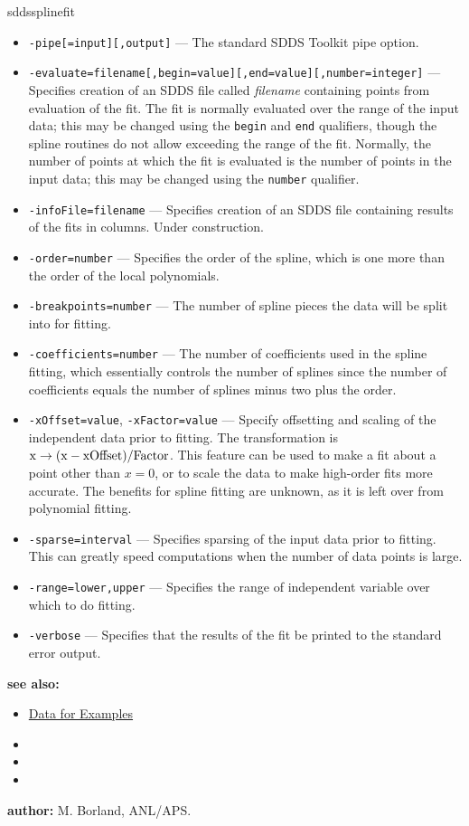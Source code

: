 \begin{sddsprog}{sddssplinefit}
    \begin{itemize}
      \item \verb|-pipe[=input][,output]| --- The standard SDDS Toolkit pipe option.
      \item \verb|-evaluate=filename[,begin=value][,end=value][,number=integer]| --- Specifies creation of an SDDS file called \emph{filename} containing points from evaluation of the fit. The fit is normally evaluated over the range of the input data; this may be changed using the \verb|begin| and \verb|end| qualifiers, though the spline routines do not allow exceeding the range of the fit. Normally, the number of points at which the fit is evaluated is the number of points in the input data; this may be changed using the \verb|number| qualifier.
      \item \verb|-infoFile=filename| --- Specifies creation of an SDDS file containing results of the fits in columns. Under construction.
      \item \verb|-order=number| --- Specifies the order of the spline, which is one more than the order of the local polynomials.
      \item \verb|-breakpoints=number| --- The number of spline pieces the data will be split into for fitting.
      \item \verb|-coefficients=number| --- The number of coefficients used in the spline fitting, which essentially controls the number of splines since the number of coefficients equals the number of splines minus two plus the order.
      \item \verb|-xOffset=value|, \verb|-xFactor=value| --- Specify offsetting and scaling of the independent data prior to fitting. The transformation is ${\rm x \rightarrow (x - xOffset)/Factor}$. This feature can be used to make a fit about a point other than $x=0$, or to scale the data to make high-order fits more accurate. The benefits for spline fitting are unknown, as it is left over from polynomial fitting.
      \item \verb|-sparse=interval| --- Specifies sparsing of the input data prior to fitting. This can greatly speed computations when the number of data points is large.
      \item \verb|-range=lower,upper| --- Specifies the range of independent variable over which to do fitting.
      \item \verb|-verbose| --- Specifies that the results of the fit be printed to the standard error output.
    \end{itemize}
  \item \textbf{see also:}
    \begin{itemize}
      \item \hyperref[exampleData]{Data for Examples}
      \item {}
      \item {}
      \item {}
    \end{itemize}
  \item \textbf{author:} M. Borland, ANL/APS.
\end{sddsprog}

